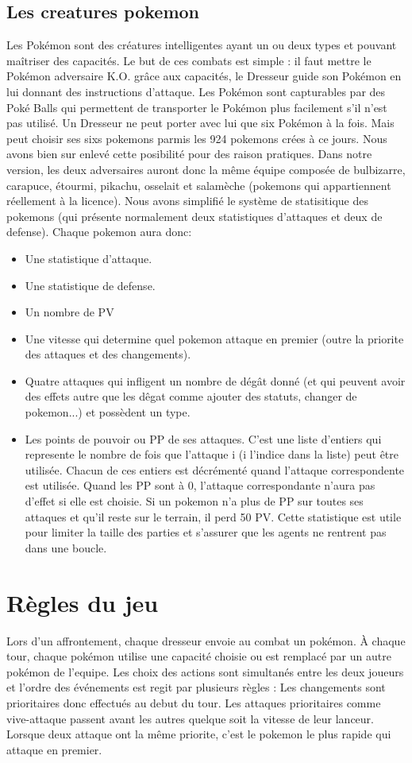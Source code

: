 	\subsection{Les creatures pokemon}
		Les Pokémon sont des créatures intelligentes ayant un ou deux types et pouvant maîtriser des capacités. Le but de ces combats est simple : il faut mettre le Pokémon 					adversaire K.O. grâce aux capacités, le Dresseur guide son Pokémon en lui donnant des instructions d'attaque.
		Les Pokémon sont capturables par des Poké Balls qui permettent de transporter le Pokémon plus facilement s'il n'est pas utilisé. Un Dresseur ne peut porter avec lui 					que six Pokémon à la fois. Mais peut choisir ses sixs pokemons parmis les 924 pokemons crées à ce jours. Nous avons bien sur enlevé cette posibilité pour des raison 					pratiques. Dans notre version, les deux adversaires auront donc la même équipe composée de bulbizarre, carapuce, étourmi, pikachu, osselait et salamèche 							(pokemons qui appartiennent réellement à la licence).
		Nous avons simplifié le système de statisitique des pokemons (qui présente normalement deux statistiques d'attaques et deux de defense). Chaque pokemon aura donc:
		\begin{itemize}
			\item Une statistique d'attaque.
			\item Une statistique de defense.
			\item Un nombre de PV
			\item Une vitesse qui determine quel pokemon attaque en premier (outre la priorite des attaques et des changements).
			\item Quatre attaques qui infligent un nombre de dégât donné (et qui peuvent avoir des effets autre que les dêgat comme ajouter des statuts, changer de 							pokemon...) et possèdent un type.
			\item Les points de pouvoir ou PP de ses attaques. C'est une liste d'entiers qui represente le nombre de fois que l'attaque i (i l'indice dans la liste) peut être utilisée. Chacun de ces entiers est décrémenté quand l'attaque correspondente est utilisée. Quand les PP sont à 0, l'attaque correspondante n'aura pas d'effet si elle est choisie. Si un pokemon n'a plus de PP sur toutes ses attaques et qu'il reste sur le terrain, il perd 50 PV. Cette statistique est utile pour limiter la taille des parties et s'assurer que les agents ne rentrent pas dans une boucle.
		\end{itemize}

    
\section{Règles du jeu}
	Lors d'un affrontement, chaque dresseur envoie au combat un pokémon. À chaque tour, chaque pokémon utilise une capacité choisie ou est remplacé par un autre pokémon 				de l'equipe. Les choix des actions sont simultanés entre les deux joueurs et l'ordre des événements est regit par plusieurs règles : Les changements sont prioritaires donc effectués 			au debut du tour. Les attaques prioritaires comme vive-attaque passent avant les autres quelque soit la vitesse de leur lanceur. Lorsque deux attaque ont la même priorite, c'est le 			pokemon le plus rapide qui attaque en premier.
	

